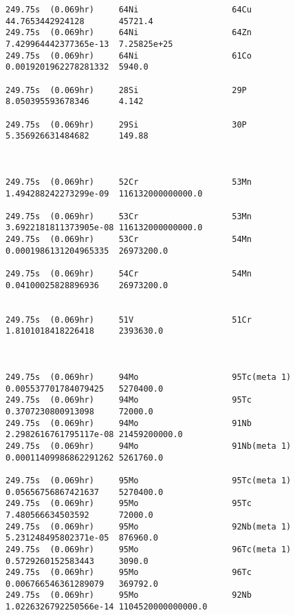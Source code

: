 \begin{lstlisting}[style=sOutputFile,caption={Final results for steel irradiation},label={listing:alexsteel}]
249.75s  (0.069hr)     64Ni                   64Cu                   44.7653442924128       45721.4               
249.75s  (0.069hr)     64Ni                   64Zn                   7.429964442377365e-13  7.25825e+25           
249.75s  (0.069hr)     64Ni                   61Co                   0.0019201962278281332  5940.0                

249.75s  (0.069hr)     28Si                   29P                    8.050395593678346      4.142                 

249.75s  (0.069hr)     29Si                   30P                    5.356926631484682      149.88                



249.75s  (0.069hr)     52Cr                   53Mn                   1.494288242273299e-09  116132000000000.0     

249.75s  (0.069hr)     53Cr                   53Mn                   3.6922181811373905e-08 116132000000000.0     
249.75s  (0.069hr)     53Cr                   54Mn                   0.0001986131204965335  26973200.0            

249.75s  (0.069hr)     54Cr                   54Mn                   0.04100025828896936    26973200.0            


249.75s  (0.069hr)     51V                    51Cr                   1.8101018418226418     2393630.0             



249.75s  (0.069hr)     94Mo                   95Tc(meta 1)           0.005537701784079425   5270400.0             
249.75s  (0.069hr)     94Mo                   95Tc                   0.3707230800913098     72000.0               
249.75s  (0.069hr)     94Mo                   91Nb                   2.2982616761795117e-08 21459200000.0         
249.75s  (0.069hr)     94Mo                   91Nb(meta 1)           0.00011409986862291262 5261760.0             

249.75s  (0.069hr)     95Mo                   95Tc(meta 1)           0.05656756867421637    5270400.0             
249.75s  (0.069hr)     95Mo                   95Tc                   7.480566634503592      72000.0               
249.75s  (0.069hr)     95Mo                   92Nb(meta 1)           5.231248495802371e-05  876960.0              
249.75s  (0.069hr)     95Mo                   96Tc(meta 1)           0.5729260152583443     3090.0                
249.75s  (0.069hr)     95Mo                   96Tc                   0.006766546361289079   369792.0              
249.75s  (0.069hr)     95Mo                   92Nb                   1.0226326792250566e-14 1104520000000000.0    


\end{lstlisting}
